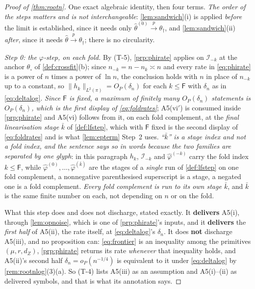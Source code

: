 \begin{proof}[Proof of \cref{thm:rootn}]
One exact algebraic identity, then four terms. \emph{The order of the steps matters and is not
interchangeable}: \cref{lem:sandwich}(i) is applied \emph{before} the limit is established, since it needs
only $\hat\theta^{(0)}\xrightarrow{p}\theta_\dagger$, and \cref{lem:sandwich}(ii) \emph{after}, since it
needs $\hat\theta\xrightarrow{p}\theta_\dagger$; there is no circularity.

\emph{Step 0: the $\varphi$-step, on each fold.} By (T-5), \cref{prp:phirate} applies on $\mathcal I_{-k}$ at
the anchor $\theta_\circ$ of \cref{def:crossfit}(b); since $n_{-k}=n-n_k\asymp n$ and every rate in
\eqref{eq:phirate} is a power of $n$ times a power of $\ln n$, the conclusion holds with $n$ in place of
$n_{-k}$ up to a constant, so $\|h_k\|_{L^{2}(\pi)}=O_P(\delta_n)$ for each $k\le\mathsf F$ with $\delta_n$
as in \eqref{eq:deltalog}. \emph{Since $\mathsf F$ is fixed, a maximum of finitely many $O_P(\delta_n)$
statements is $O_P(\delta_n)$, which is the first display of \eqref{eq:foldrates}}; A5(vi$'$) is consumed
inside \cref{prp:phirate} and A5(vi) follows from it, on each fold complement, at the \emph{final
linearisation stage} $\bar k$ of \cref{def:lfstep}, which with
$\mathsf F$ fixed is the second display of \eqref{eq:foldrates} and is what \cref{lem:epterm} Step~2 uses.
\emph{``$\bar k$'' is a stage index and not a fold index, and the sentence says so in words because the two
families are separated by one glyph}: in this paragraph $h_k$, $\mathcal I_{-k}$ and $\hat\varphi^{(-k)}$
carry the fold index $k\le\mathsf F$, while $\hat\varphi^{(0)},\dots,\hat\varphi^{(\bar k)}$ are the stages
of a \emph{single} run of \cref{def:lfstep} on one fold complement, a nonnegative parenthesised
superscript is a stage, a negated one is a fold complement. \emph{Every fold complement is run to its own
stage $\bar k$}, and $\bar k$ is the same finite number on each, not depending on $n$ or on the fold.

What this step does and does not discharge, stated exactly.
It \textbf{delivers} A5(i), through \cref{lem:opnoise}, which is one of \cref{prp:phirate}'s inputs, and
it \textbf{delivers} the \emph{first half} of A5(ii), the rate itself, at \eqref{eq:deltalog}'s $\delta_n$.
It does \textbf{not} discharge A5(iii), and no proposition can: \eqref{eq:frontier} is an inequality among
the primitives $(\mu,r,d_Z)$, \cref{prp:phirate} returns its rate \emph{whenever} that inequality holds, and
A5(ii)'s second half $\delta_n=o_P(n^{-1/4})$ is equivalent to it under \eqref{eq:deltalog} by
\cref{rem:rootnlog}\textup{(3)(a)}. So (T-4) lists A5(iii) as an assumption and A5(i)--(ii) as
delivered symbols, and that is what its annotation says.


\end{proof}
